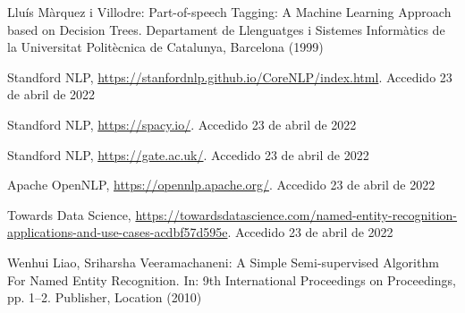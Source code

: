 \documentclass[runningheads]{llncs}
\begin{document}
\begin{thebibliography}{8}
Lluís Màrquez i Villodre: Part-of-speech Tagging: A Machine Learning Approach based on Decision Trees. Departament de Llenguatges i Sistemes Informàtics de la Universitat Politècnica de Catalunya, Barcelona (1999)

Standford NLP, \url{https://stanfordnlp.github.io/CoreNLP/index.html}. Accedido 23 de abril de 2022

Standford NLP, \url{https://spacy.io/}. Accedido 23 de abril de 2022

Standford NLP, \url{https://gate.ac.uk/}. Accedido 23 de abril de 2022

Apache OpenNLP, \url{https://opennlp.apache.org/}. Accedido 23 de abril de 2022

Towards Data Science, \url{https://towardsdatascience.com/named-entity-recognition-applications-and-use-cases-acdbf57d595e}. Accedido 23 de abril de 2022

Wenhui Liao, Sriharsha Veeramachaneni: A Simple Semi-supervised Algorithm For
Named Entity Recognition. In: 9th International Proceedings
on Proceedings, pp. 1--2. Publisher, Location (2010)

\end{thebibliography}
\end{document}
